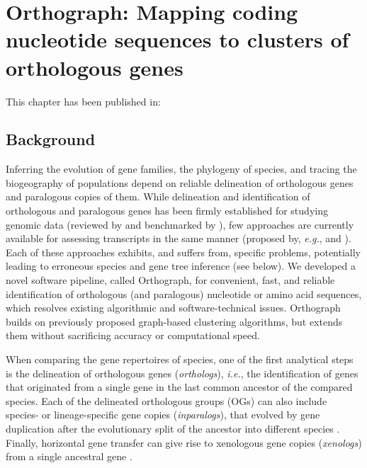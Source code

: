 
\chapter{Orthograph: Mapping coding nucleotide sequences to clusters of
orthologous genes}
\label{cha:orthograph}


This chapter has been published in: 

\section{Background}\label{background}

Inferring the evolution of gene families, the phylogeny of species, and
tracing the biogeography of populations depend on reliable delineation
of orthologous genes and paralogous copies of them. While delineation
and identification of orthologous and paralogous genes has been firmly
established for studying genomic data (reviewed by \cite{Kristensen2011}
and benchmarked by \cite{Trachana2011}), few approaches are currently
available for assessing transcripts in the same manner (proposed by,
\emph{e.g.}, \cite{Ebersberger2009} and \cite{Schreiber2009}). Each of
these approaches exhibits, and suffers from, specific problems,
potentially leading to erroneous species and gene tree inference (see
below). We developed a novel software pipeline, called Orthograph, for
convenient, fast, and reliable identification of orthologous (and
paralogous) nucleotide or amino acid sequences, which resolves existing
algorithmic and software-technical issues. Orthograph builds on
previously proposed graph-based clustering algorithms, but extends them
without sacrificing accuracy or computational speed.

When comparing the gene repertoires of species, one of the first
analytical steps is the delineation of orthologous genes
(\emph{orthologs}), \emph{i.e.}, the identification of genes that
originated from a single gene in the last common ancestor of the
compared species. Each of the delineated orthologous groups (OGs) can
also include species- or lineage-specific gene copies
(\emph{inparalogs}), that evolved by gene duplication after the
evolutionary split of the ancestor into different species
\cite{Koonin2005}. Finally, horizontal gene transfer can give rise to
xenologous gene copies (\emph{xenologs}) from a single ancestral gene
\cite{Koonin2005}.

